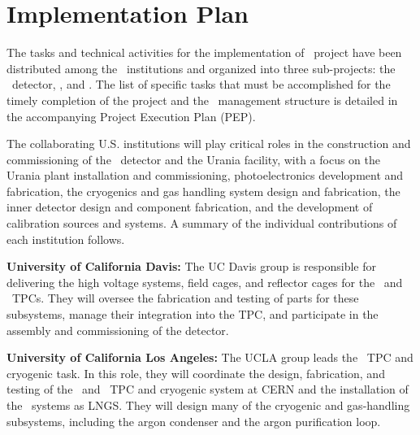 \section{Implementation Plan}
\label{sec:implementation}



The tasks and technical activities for the implementation of \DSk\ project have been distributed among the \GADMC\ institutions and organized into three sub-projects: the \DSks\ detector, \Urania, and \Aria. The list of specific tasks that must be accomplished for the timely completion of the project and the \GADMC\ management structure is detailed in the accompanying Project Execution Plan (PEP).


The collaborating U.S. institutions will play critical roles in the construction and commissioning of the \DSks\ detector and the Urania facility, with a focus on the Urania plant installation and commissioning, photoelectronics development and fabrication, the cryogenics and gas handling system design and fabrication, the inner detector design and component fabrication, and the development of calibration sources and systems. A summary of the individual contributions of each institution follows.

{\bf University of California Davis:} The UC Davis group is responsible for delivering the high voltage systems, field cages, and reflector cages for the \DSps\ and \DSks\ TPCs. They will oversee the fabrication and testing of parts for these subsystems, manage their integration into the TPC, and participate in the assembly and commissioning of the detector.

{\bf University of California Los Angeles:} The UCLA group leads the \DSks\ TPC and cryogenic task. In this role, they will coordinate  the design, fabrication, and testing of the \DSps\ and \DSks\ TPC and cryogenic system at CERN and the installation of the \DSks\ systems as LNGS. They will design many of the cryogenic and gas-handling subsystems, including the argon condenser and the argon purification loop.

